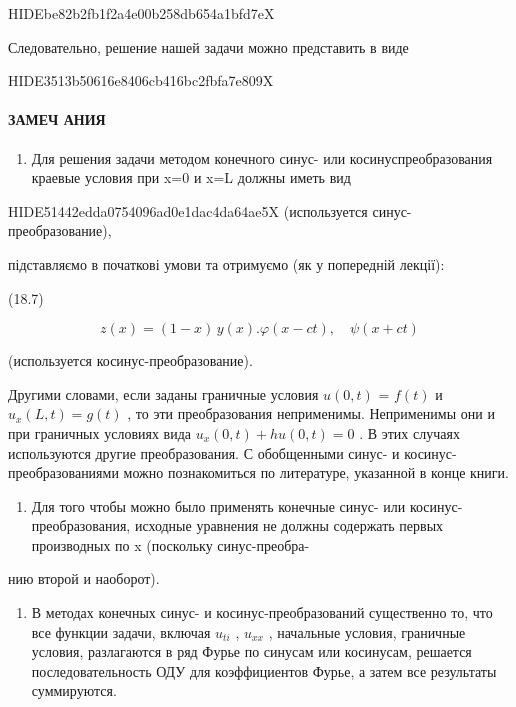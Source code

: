 \documentclass[
  ukrainian,
]{article}
\providecommand{\tightlist}{%
  \setlength{\itemsep}{0pt}\setlength{\parskip}{0pt}}
\begin{document}
HIDEbe82b2fb1f2a4e00b258db654a1bfd7eX

Следовательно, решение нашей задачи можно представить в виде

HIDE3513b50616e8406cb416bc2fbfa7e809X

\paragraph{ЗАМЕЧ
АНИЯ}\label{ux437ux430ux43cux435ux447-ux430ux43dux438ux44f}

\begin{enumerate}
\def\labelenumi{\arabic{enumi}.}
\tightlist
\item
  Для решения задачи методом конечного синус- или косинуспреобразования
  краевые условия при x=0 и x=L должны иметь вид
\end{enumerate}

HIDE51442edda0754096ad0e1dac4da64ae5X (используется
синус-преобразование),

підставляємо в початкові умови та отримуємо (як у попередній лекції):

(18.7)

\[
z(x) = (1 - x)\, y(x).
\varphi(x-ct), \quad \psi(x+ct)
\]

(используется косинус-преобразование).

Другими словами, если заданы граничные условия \(u(0, t)\) = \(f(t)\) и
\(u_x(L, t) = g(t)\) , то эти преобразования неприменимы. Неприменимы
они и при граничных условиях вида \(u_x(0, t) + hu(0, t) = 0\) . В этих
случаях используются другие преобразования. С обобщенными синус- и
косинус-преобразованиями можно познакомиться по литературе, указанной в
конце книги.

\begin{enumerate}
\def\labelenumi{\arabic{enumi}.}
\setcounter{enumi}{1}
\tightlist
\item
  Для того чтобы можно было применять конечные синус- или
  косинус-преобразования, исходные уравнения не должны содержать первых
  производных по x (поскольку синус-преобра-
\end{enumerate}

нию второй и наоборот).

\begin{enumerate}
\def\labelenumi{\arabic{enumi}.}
\setcounter{enumi}{2}
\tightlist
\item
  В методах конечных синус- и косинус-преобразований существенно то, что
  все функции задачи, включая \(u_{ti}\) , \(u_{xx}\) , начальные
  условия, граничные условия, разлагаются в ряд Фурье по синусам или
  косинусам, решается последовательность ОДУ для коэффициентов Фурье, а
  затем все результаты суммируются.
\end{enumerate}
\end{document}
